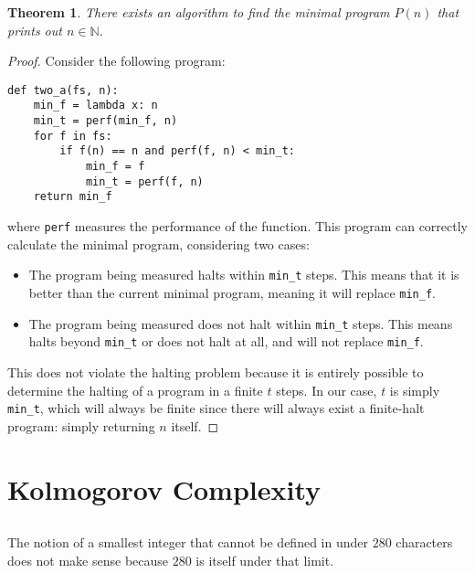 \documentclass{article}
\newtheorem{theorem}{Theorem}
\newcommand{\N}{\mathbb{N}}
\begin{document}
\begin{theorem}
    There exists an algorithm to find the minimal program \(P(n)\) that prints out \(n \in \N\).
\end{theorem}
\begin{proof}
    Consider the following program:
    \begin{lstlisting}
def two_a(fs, n):
    min_f = lambda x: n
    min_t = perf(min_f, n)
    for f in fs:
        if f(n) == n and perf(f, n) < min_t:
            min_f = f
            min_t = perf(f, n)
    return min_f
    \end{lstlisting}
    where \lstinline|perf| measures the performance of the function.
    This program can correctly calculate the minimal program, considering two cases:
    \begin{itemize}
        \item The program being measured halts within \lstinline|min_t| steps.
        This means that it is better than the current minimal program, meaning it will replace \lstinline|min_f|.
        \item The program being measured does not halt within \lstinline|min_t| steps.
        This means halts beyond \lstinline|min_t| or does not halt at all, and will not replace \lstinline|min_f|.
    \end{itemize}
    This does not violate the halting problem because it is entirely possible to determine the halting of a program in a finite \(t\) steps.
    In our case, \(t\) is simply \lstinline|min_t|, which will always be finite since there will always exist a finite-halt program: simply returning \(n\) itself.
\end{proof}

\section{Kolmogorov Complexity}

\subsection{}

The notion of a smallest integer that cannot be defined in under \(280\) characters does not make sense because \(280\) is itself under that limit.

\subsection{}
\end{document}
